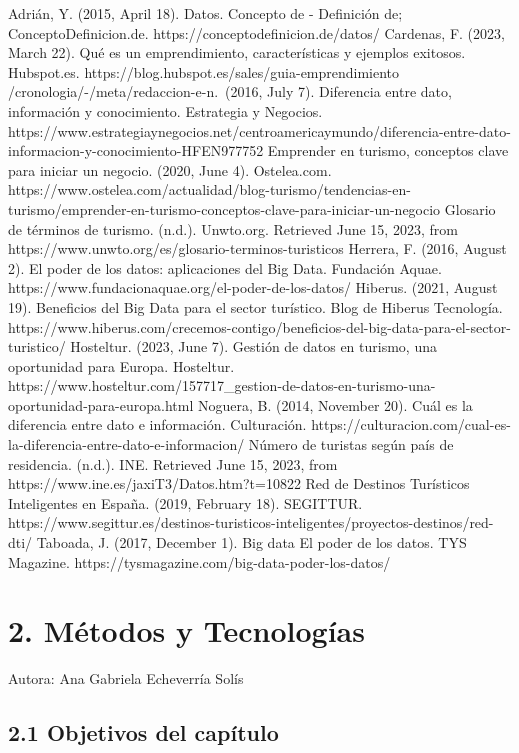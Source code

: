 \documentclass[
  letterpaper,
  DIV=11,
  numbers=noendperiod]{scrreprt}
\begin{document}
Adrián, Y. (2015, April 18). Datos. Concepto de - Definición de;
ConceptoDefinicion.de. https://conceptodefinicion.de/datos/ Cardenas, F.
(2023, March 22). Qué es un emprendimiento, características y ejemplos
exitosos. Hubspot.es. https://blog.hubspot.es/sales/guia-emprendimiento
/cronologia/-/meta/redaccion-e-n.~(2016, July 7). Diferencia entre dato,
información y conocimiento. Estrategia y Negocios.
https://www.estrategiaynegocios.net/centroamericaymundo/diferencia-entre-dato-informacion-y-conocimiento-HFEN977752
Emprender en turismo, conceptos clave para iniciar un negocio. (2020,
June 4). Ostelea.com.
https://www.ostelea.com/actualidad/blog-turismo/tendencias-en-turismo/emprender-en-turismo-conceptos-clave-para-iniciar-un-negocio
Glosario de términos de turismo. (n.d.). Unwto.org. Retrieved June 15,
2023, from https://www.unwto.org/es/glosario-terminos-turisticos
Herrera, F. (2016, August 2). El poder de los datos: aplicaciones del
Big Data. Fundación Aquae.
https://www.fundacionaquae.org/el-poder-de-los-datos/ Hiberus. (2021,
August 19). Beneficios del Big Data para el sector turístico. Blog de
Hiberus Tecnología.
https://www.hiberus.com/crecemos-contigo/beneficios-del-big-data-para-el-sector-turistico/
Hosteltur. (2023, June 7). Gestión de datos en turismo, una oportunidad
para Europa. Hosteltur.
https://www.hosteltur.com/157717\_gestion-de-datos-en-turismo-una-oportunidad-para-europa.html
Noguera, B. (2014, November 20). Cuál es la diferencia entre dato e
información. Culturación.
https://culturacion.com/cual-es-la-diferencia-entre-dato-e-informacion/
Número de turistas según país de residencia. (n.d.). INE. Retrieved June
15, 2023, from https://www.ine.es/jaxiT3/Datos.htm?t=10822 Red de
Destinos Turísticos Inteligentes en España. (2019, February 18).
SEGITTUR.
https://www.segittur.es/destinos-turisticos-inteligentes/proyectos-destinos/red-dti/
Taboada, J. (2017, December 1). Big data El poder de los datos. TYS
Magazine. https://tysmagazine.com/big-data-poder-los-datos/


\hypertarget{muxe9todos-y-tecnologuxedas}{%
\chapter{2. Métodos y Tecnologías}\label{muxe9todos-y-tecnologuxedas}}

Autora: Ana Gabriela Echeverría Solís

\hypertarget{objetivos-del-capuxedtulo}{%
\section{2.1 Objetivos del capítulo}\label{objetivos-del-capuxedtulo}}
\end{document}
